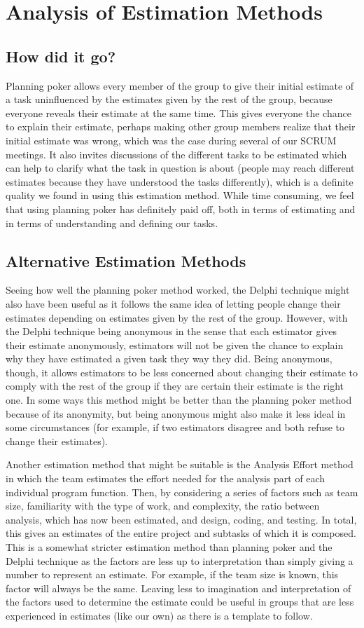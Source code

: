 \section{Analysis of Estimation Methods}
\subsection{How did it go?}
Planning poker allows every member of the group to give their initial estimate of a task uninfluenced by the estimates given by the rest of the group, because everyone reveals their estimate at the same time. This gives everyone the chance to explain their estimate, perhaps making other group members realize that their initial estimate was wrong, which was the case during several of our SCRUM meetings. It also invites discussions of the different tasks to be estimated which can help to clarify what the task in question is about (people may reach different estimates because they have understood the tasks differently), which is a definite quality we found in using this estimation method. While time consuming, we feel that using planning poker has definitely paid off, both in terms of estimating and in terms of understanding and defining our tasks.

\subsection{Alternative Estimation Methods}
Seeing how well the planning poker method worked, the Delphi technique \cite{caye} might also have been useful as it follows the same idea of letting people change their estimates depending on estimates given by the rest of the group. However, with the Delphi technique being anonymous in the sense that each estimator gives their estimate anonymously, estimators will not be given the chance to explain why they have estimated a given task they way they did. Being anonymous, though, it allows estimators to be less concerned about changing their estimate to comply with the rest of the group if they are certain their estimate is the right one. In some ways this method might be better than the planning poker method because of its anonymity, but being anonymous might also make it less ideal in some circumstances (for example, if two estimators disagree and both refuse to change their estimates).

Another estimation method that might be suitable is the Analysis Effort method \cite{caye} in which the team estimates the effort needed for the analysis part of each individual program function. Then, by considering a series of factors such as team size, familiarity with the type of work, and complexity, the ratio between analysis, which has now been estimated, and design, coding, and testing. In total, this gives an estimates of the entire project and subtasks of which it is composed. This is a somewhat stricter estimation method than planning poker and the Delphi technique as the factors are less up to interpretation than simply giving a number to represent an estimate. For example, if the team size is known, this factor will always be the same. Leaving less to imagination and interpretation of the factors used to determine the estimate could be useful in groups that are less experienced in estimates (like our own) as there is a template to follow.